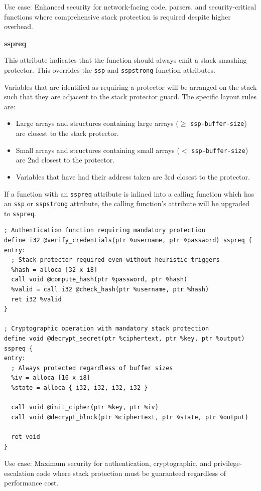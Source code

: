 Use case: Enhanced security for network-facing code, parsers, and security-critical functions where comprehensive stack protection is required despite higher overhead.

\textbf{sspreq}

This attribute indicates that the function should always emit a stack smashing protector.
This overrides the \texttt{ssp} and \texttt{sspstrong} function attributes.

Variables that are identified as requiring a protector will be arranged on the stack such that they are adjacent to the stack protector guard.
The specific layout rules are:

\begin{itemize}
\item Large arrays and structures containing large arrays ($\geq$ \texttt{ssp-buffer-size}) are closest to the stack protector.
\item Small arrays and structures containing small arrays ($<$ \texttt{ssp-buffer-size}) are 2nd closest to the protector.
\item Variables that have had their address taken are 3rd closest to the protector.
\end{itemize}

If a function with an \texttt{sspreq} attribute is inlined into a calling function which has an \texttt{ssp} or \texttt{sspstrong} attribute, the calling function's attribute will be upgraded to \texttt{sspreq}.

\begin{lstlisting}[style=ir]
; Authentication function requiring mandatory protection
define i32 @verify_credentials(ptr %username, ptr %password) sspreq {
entry:
  ; Stack protector required even without heuristic triggers
  %hash = alloca [32 x i8]
  call void @compute_hash(ptr %password, ptr %hash)
  %valid = call i32 @check_hash(ptr %username, ptr %hash)
  ret i32 %valid
}

; Cryptographic operation with mandatory stack protection
define void @decrypt_secret(ptr %ciphertext, ptr %key, ptr %output) sspreq {
entry:
  ; Always protected regardless of buffer sizes
  %iv = alloca [16 x i8]
  %state = alloca { i32, i32, i32, i32 }

  call void @init_cipher(ptr %key, ptr %iv)
  call void @decrypt_block(ptr %ciphertext, ptr %state, ptr %output)

  ret void
}
\end{lstlisting}

Use case: Maximum security for authentication, cryptographic, and privilege-escalation code where stack protection must be guaranteed regardless of performance cost.


